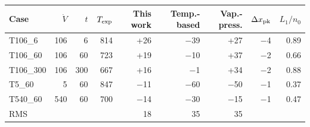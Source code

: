 \begin{tabular}{lrrrrrrrr}
\toprule
Case & $\dot V$ & $t$ & $T_{\rm exp}$ & This work & Temp.-based & Vap.-press. & $\Delta x_{\rm pk}$ & $L_1/n_0$ \\
\midrule
T106\_6 & 106 & 6 & 814 & +26 & $-$39 & +27 & $-$4 & 0.89 \\
T106\_60 & 106 & 60 & 723 & +19 & $-$10 & +37 & $-$2 & 0.66 \\
T106\_300 & 106 & 300 & 667 & +16 & $-$1 & +34 & $-$2 & 0.88 \\
T5\_60 & 5 & 60 & 847 & $-$11 & $-$60 & $-$50 & $-$1 & 0.37 \\
T540\_60 & 540 & 60 & 700 & $-$14 & $-$30 & $-$15 & $-$1 & 0.47 \\
\midrule
RMS &  &  &  & 18 & 35 & 35 &  &  \\
\bottomrule
\end{tabular}
